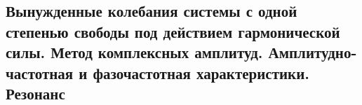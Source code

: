 

\subsection{Вынужденные колебания системы с одной степенью свободы под действием гармонической силы. Метод комплексных амплитуд. Амплитудно-частотная и фазочастотная характеристики. Резонанс}



